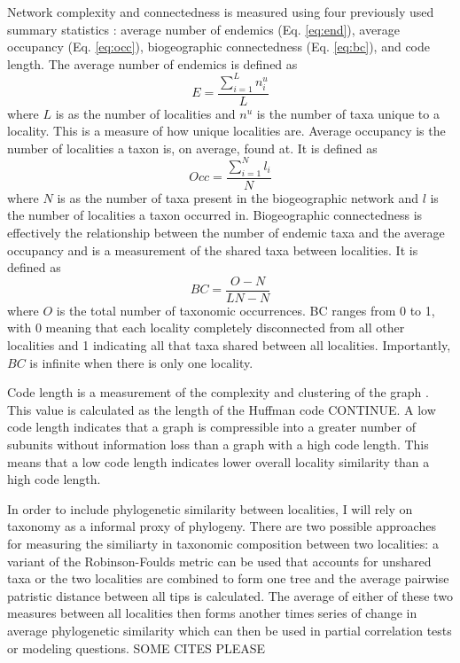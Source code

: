 \documentclass[12pt,letterpaper]{article}
\begin{document}
Network complexity and connectedness is measured using four previously used summary statistics \citep{Sidor2013}: average number of endemics (Eq. \ref{eq:end}), average occupancy (Eq. \ref{eq:occ}), biogeographic connectedness (Eq. \ref{eq:bc}), and code length. The average number of endemics is defined as 
\begin{equation}
  E = \frac{\sum_{i = 1}^{L} n_{i}^{u}}{L}
  \label{eq:end}
\end{equation}
where \(L\) is as the number of localities and \(n^{u}\) is the number of taxa unique to a locality. This is a measure of how unique localities are. Average occupancy is the number of localities a taxon is, on average, found at. It is defined as 
\begin{equation}
  Occ = \frac{\sum_{i = 1}^{N} l_{i}}{N}
  \label{eq:occ}
\end{equation}
where \(N\) is as the number of taxa present in the biogeographic network and \(l\) is the number of localities a taxon occurred in. Biogeographic connectedness is effectively the relationship between the number of endemic taxa and the average occupancy and is a measurement of the shared taxa between localities. It is defined as 
\begin{equation}
  BC = \frac{O - N}{LN - N}
  \label{eq:bc}
\end{equation}
where \(O\) is the total number of taxonomic occurrences. BC ranges from 0 to 1, with 0 meaning that each locality completely disconnected from all other localities and 1 indicating all that taxa shared between all localities. Importantly, \(BC\) is infinite when there is only one locality.

Code length is a measurement of the complexity and clustering of the graph \citep{Rosvall2008,Rosvall2010b}. This value is calculated as the length of the Huffman code CONTINUE. A low code length indicates that a graph is compressible into a greater number of subunits without information loss than a graph with a high code length. This means that a low code length indicates lower overall locality similarity than a high code length. 

In order to include phylogenetic similarity between localities, I will rely on taxonomy as a informal proxy of phylogeny. There are two possible approaches for measuring the similiarty in taxonomic composition between two localities: a variant of the Robinson-Foulds metric can be used that accounts for unshared taxa or the two localities are combined to form one tree and the average pairwise patristic distance between all tips is calculated. The average of either of these two measures between all localities then forms another times series of change in average phylogenetic similarity which can then be used in partial correlation tests or modeling questions. SOME CITES PLEASE
\end{document}
